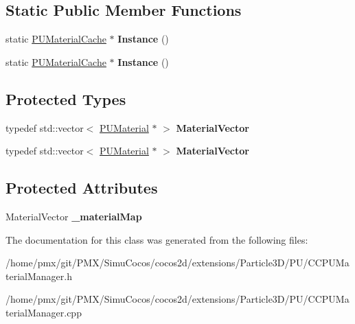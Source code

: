 \subsection*{Static Public Member Functions}
\begin{DoxyCompactItemize}
\item 
\mbox{\label{classPUMaterialCache_a2a7c025d1b707ef0ee229803a32b64f2}} 
static \hyperlink{classPUMaterialCache}{P\+U\+Material\+Cache} $\ast$ {\bfseries Instance} ()
\item 
\mbox{\label{classPUMaterialCache_a582e197ec884d588949a76aba032fe06}} 
static \hyperlink{classPUMaterialCache}{P\+U\+Material\+Cache} $\ast$ {\bfseries Instance} ()
\end{DoxyCompactItemize}
\subsection*{Protected Types}
\begin{DoxyCompactItemize}
\item 
\mbox{\label{classPUMaterialCache_acbbd25c11db2256b1750d0e3b0de48f9}} 
typedef std\+::vector$<$ \hyperlink{classPUMaterial}{P\+U\+Material} $\ast$ $>$ {\bfseries Material\+Vector}
\item 
\mbox{\label{classPUMaterialCache_acbbd25c11db2256b1750d0e3b0de48f9}} 
typedef std\+::vector$<$ \hyperlink{classPUMaterial}{P\+U\+Material} $\ast$ $>$ {\bfseries Material\+Vector}
\end{DoxyCompactItemize}
\subsection*{Protected Attributes}
\begin{DoxyCompactItemize}
\item 
\mbox{\label{classPUMaterialCache_af399532c31334e84676123deb83e3a5b}} 
Material\+Vector {\bfseries \+\_\+material\+Map}
\end{DoxyCompactItemize}


The documentation for this class was generated from the following files\+:\begin{DoxyCompactItemize}
\item 
/home/pmx/git/\+P\+M\+X/\+Simu\+Cocos/cocos2d/extensions/\+Particle3\+D/\+P\+U/C\+C\+P\+U\+Material\+Manager.\+h\item 
/home/pmx/git/\+P\+M\+X/\+Simu\+Cocos/cocos2d/extensions/\+Particle3\+D/\+P\+U/C\+C\+P\+U\+Material\+Manager.\+cpp\end{DoxyCompactItemize}
